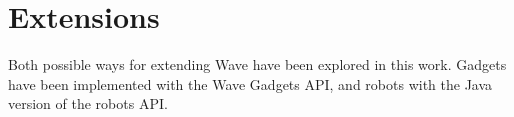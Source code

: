 \newpage
\section{Extensions}

Both possible ways for extending Wave have been explored in this work. Gadgets have been implemented with the Wave Gadgets API, and robots with the Java version of the robots API.





